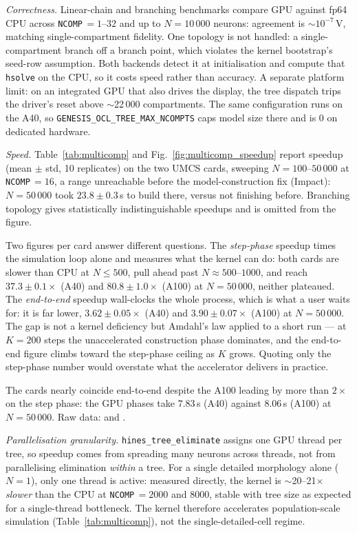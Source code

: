 \documentclass[preprint,12pt, a4paper]{elsarticle}
\newcommand{\hte}{\texttt{hines\_\allowbreak tree\_\allowbreak eliminate}}
\begin{document}
\begin{enumerate}
\emph{Correctness.} Linear-chain and branching benchmarks compare GPU against fp64 CPU across \texttt{NCOMP}\,$=1$--$32$ and up to $N=10\,000$ neurons: agreement is $\sim$$10^{-7}$\,V, matching single-compartment fidelity. One topology is not handled: a single-compartment branch off a branch point, which violates the kernel bootstrap's seed-row assumption. Both backends detect it at initialisation and compute that \texttt{hsolve} on the CPU, so it costs speed rather than accuracy. A separate platform limit: on an integrated GPU that also drives the display, the tree dispatch trips the driver's reset above $\sim$22\,000 compartments. The same configuration runs on the A40, so \texttt{GENESIS\_OCL\_TREE\_MAX\_NCOMPTS} caps model size there and is 0 on dedicated hardware.

\emph{Speed.} Table~\ref{tab:multicomp} and Fig.~\ref{fig:multicomp_speedup} report speedup (mean $\pm$ std, 10 replicates) on the two UMCS cards, sweeping $N=100$--$50\,000$ at \texttt{NCOMP}\,$=16$, a range unreachable before the model-construction fix (Impact): $N=50\,000$ took $23.8\pm0.3$\,s to build there, versus not finishing before. Branching topology gives statistically indistinguishable speedups and is omitted from the figure.

Two figures per card answer different questions. The \emph{step-phase} speedup times the simulation loop alone and measures what the kernel can do: both cards are slower than CPU at $N\leq500$, pull ahead past $N\approx500$--$1000$, and reach $37.3\pm0.1\times$ (A40) and $80.8\pm1.0\times$ (A100) at $N=50\,000$, neither plateaued. The \emph{end-to-end} speedup wall-clocks the whole process, which is what a user waits for: it is far lower, $3.62\pm0.05\times$ (A40) and $3.90\pm0.07\times$ (A100) at $N=50\,000$. The gap is not a kernel deficiency but Amdahl's law applied to a short run --- at $K=200$ steps the unaccelerated construction phase dominates, and the end-to-end figure climbs toward the step-phase ceiling as $K$ grows. Quoting only the step-phase number would overstate what the accelerator delivers in practice.

The cards nearly coincide end-to-end despite the A100 leading by more than $2\times$ on the step phase: the GPU phases take $7.83$\,s (A40) against $8.06$\,s (A100) at $N=50\,000$. Raw data: \protect{} and \protect{}.

\emph{Parallelisation granularity.} \hte{} assigns one GPU thread per tree, so speedup comes from spreading many neurons across threads, not from parallelising elimination \emph{within} a tree. For a single detailed morphology alone ($N=1$), only one thread is active: measured directly, the kernel is $\sim$20--21$\times$ \emph{slower} than the CPU at \texttt{NCOMP}\,$=2000$ and $8000$, stable with tree size as expected for a single-thread bottleneck. The kernel therefore accelerates population-scale simulation (Table~\ref{tab:multicomp}), not the single-detailed-cell regime.


\end{enumerate}
\end{document}
